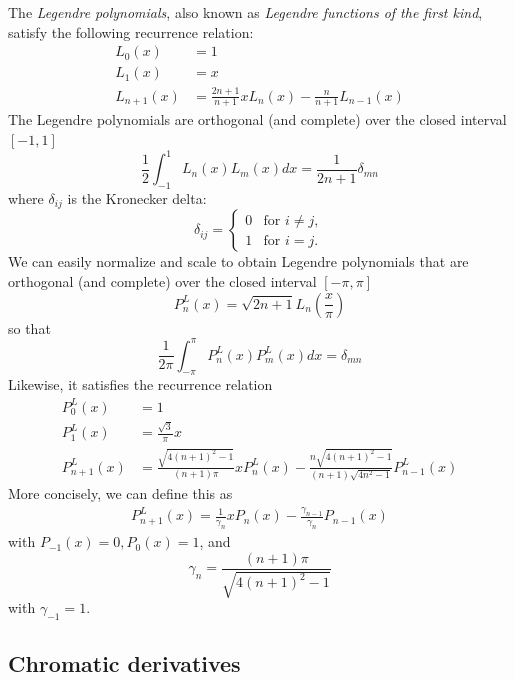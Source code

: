 \documentclass[11pt]{article} %
\theoremstyle{plain}
\theoremstyle{definition}
\theoremstyle{remark}
\begin{document}
The \emph{Legendre polynomials}, also known as \emph{Legendre functions of the 
first kind}, satisfy the following recurrence relation:
\begin{align}
L_0(x)     &= 1 \\
L_1(x)     &= x \\
L_{n+1}(x) &= \frac{2n+1}{n+1} x L_n(x) - \frac{n}{n+1} L_{n-1}(x)
\end{align}
The Legendre polynomials are orthogonal (and complete) over the closed interval 
$[-1, 1]$
\begin{equation*}
  \frac{1}{2}\int_{-1}^{1} L_n(x)L_m(x) dx = \frac{1}{2n+1} \delta_{mn}
\end{equation*}
where $\delta_{ij}$ is the Kronecker delta:
\begin{equation}
  \delta_{ij} =
    \begin{cases}
     0       & \text{for } i \neq j, \\
     1       & \text{for } i = j.
    \end{cases}
\end{equation}
We can easily normalize and scale to obtain Legendre polynomials that are
orthogonal (and complete) over the closed interval $[-\pi,\pi]$
\begin{equation}
  P_n^L(x) = \sqrt{2n+1}L_n\left(\frac{x}{\pi}\right)
\end{equation}
so that 
\begin{equation*}
\frac{1}{2\pi} \int_{-\pi}^{\pi} P_n^L(x)P_m^L(x) dx = \delta_{mn}
\end{equation*}
Likewise, it satisfies the recurrence relation
\begin{align}
P_0^L(x)     &= 1 \\
P_1^L(x)     &= \frac{\sqrt{3}}{\pi} x \\
P_{n+1}^L(x) &= \frac{\sqrt{4(n+1)^2-1}}{(n+1) \pi} x P_n^L(x) - \frac{n\sqrt{4(n+1)^2-1}}{(n+1)\sqrt{4n^2-1}} P_{n-1}^L(x)
\end{align}
More concisely, we can define this as
\begin{align}
  P_{n+1}^L(x) = \frac{1}{\gamma_n} x P_n(x) - \frac{\gamma_{n-1}}{\gamma_n} P_{n-1}(x)
\end{align}
with $P_{-1}(x)=0, P_0(x)=1$, and
\begin{equation}
  \gamma_n = \frac{(n+1) \pi}{\sqrt{4(n+1)^2-1}}
\end{equation}
with $\gamma_{-1} = 1$.

\subsection{Chromatic derivatives}
\end{document}
